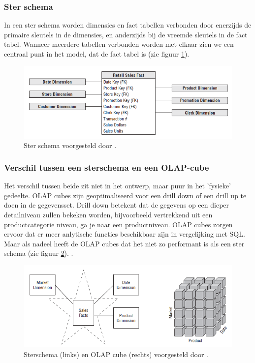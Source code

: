 \subsubsection{Ster schema}
In een ster schema worden dimensies en fact tabellen verbonden door enerzijds de primaire sleutels in de dimensies, en anderzijds bij de vreemde sleutels in de fact tabel. Wanneer meerdere tabellen verbonden worden met elkaar zien we een centraal punt in het model, dat de fact tabel is (zie figuur \ref{fig:ster}). 

\begin{figure}[h]
	\includegraphics[scale=0.8]{../images/ster.PNG}
	\caption{Ster schema voorgesteld door \textcite{Kimball2013}.}
	\label{fig:ster}
\end{figure}

\subsubsection{Verschil tussen een sterschema en een OLAP-cube}
Het verschil tussen beide zit niet in het ontwerp, maar puur in het 'fysieke' gedeelte.
OLAP cubes zijn geoptimaliseerd voor een drill down of een drill up te doen in de gegevensset.
Drill down betekent dat de gegevens op een dieper detailniveau zullen bekeken worden, bijvoorbeeld vertrekkend uit een productcategorie niveau, ga je naar een productniveau. OLAP cubes zorgen ervoor dat er meer anlytische functies beschikbaar zijn in vergelijking met SQL. Maar als nadeel heeft de OLAP cubes dat het niet zo performant is als een ster schema  (zie figuur \ref{fig:stervsolap}).  \autocite{Kimball2013}. 

\begin{figure}[h]
	\includegraphics[scale=0.8]{../images/starvsolap.PNG}
	\caption{Sterschema (links) en OLAP cube (rechts) voorgesteld door \textcite{Kimball2013}.}
	\label{fig:stervsolap}
\end{figure}

